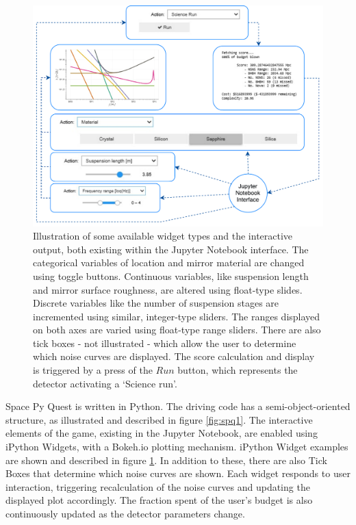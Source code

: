 \documentclass{article}
\begin{document}
\begin{figure}[h!]
    \centering
    \includegraphics[scale=0.75]{close-up.pdf}
    \caption{Illustration of some available widget types and the
      interactive output, both existing within the Jupyter Notebook
      interface. The categorical variables of location and mirror
      material are changed using toggle buttons. Continuous variables,
      like suspension length and mirror surface roughness, are altered
      using float-type slides. Discrete variables like the number of
      suspension stages are incremented using similar, integer-type
      sliders. The ranges displayed on both axes are varied using
      float-type range sliders. There are also tick boxes - not
      illustrated - which allow the user to determine which noise
      curves are displayed. The score calculation and display is
      triggered by a press of the $Run$ button, which represents the
      detector activating a `Science run'.}
    \label{fig:spq2}
\end{figure}

Space Py Quest is written in Python. The driving code has a
semi-object-oriented structure, as illustrated and described in figure
\ref{fig:spq1}. The interactive elements of the game, existing in the
Jupyter Notebook, are enabled using iPython Widgets, with a Bokeh.io
plotting mechanism. iPython Widget examples are shown and described in
figure \ref{fig:spq2}. In addition to these, there are also Tick Boxes
that determine which noise curves are shown. Each widget responds to
user interaction, triggering recalculation of the noise curves and
updating the displayed plot accordingly. The fraction spent of the
user's budget is also continuously updated as the detector parameters
change.
\end{document}
